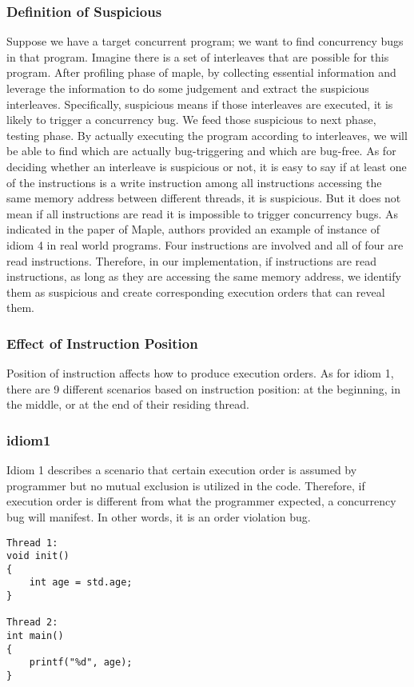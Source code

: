\documentclass[twocolumn]{article}
\begin{document}
\subsubsection{Definition of Suspicious}
Suppose we have a target concurrent program; we want to find concurrency bugs in that program. Imagine there is a set of interleaves that are possible for this program. After profiling phase of maple, by collecting essential information and leverage the information to do some judgement and extract the suspicious interleaves. Specifically, suspicious means if those interleaves are executed, it is likely to trigger a concurrency bug. We feed those suspicious to next phase, testing phase. By actually executing the program according to interleaves, we will be able to find which are actually bug-triggering and which are bug-free. As for deciding whether an interleave is suspicious or not, it is easy to say if at least one of the instructions is a write instruction among all instructions accessing the same memory address between different threads, it is suspicious. But it does not mean if all instructions are read it is impossible to trigger concurrency bugs. As indicated in the paper of Maple, authors provided an example of instance of idiom 4 in real world programs. Four instructions are involved and all of four are read instructions. Therefore, in our implementation, if instructions are read instructions, as long as they are accessing the same memory address, we identify them as suspicious and create corresponding execution orders that can reveal them. 

\subsubsection{Effect of Instruction Position}
Position of instruction affects how to produce execution orders. As for idiom 1, there are 9 different scenarios based on instruction position: at the beginning, in the middle, or at the end of their residing thread. 

\subsubsection{idiom1}
Idiom 1 describes a scenario that certain execution order is assumed by programmer but no mutual exclusion is utilized in the code. Therefore, if execution order is different from what the programmer expected, a concurrency bug will manifest. In other words, it is an order violation bug. 

\begin{lstlisting}
Thread 1:
void init()
{
	int age = std.age;
}

Thread 2:
int main()
{
	printf("%d", age);
}
\end{lstlisting}
\end{document}
